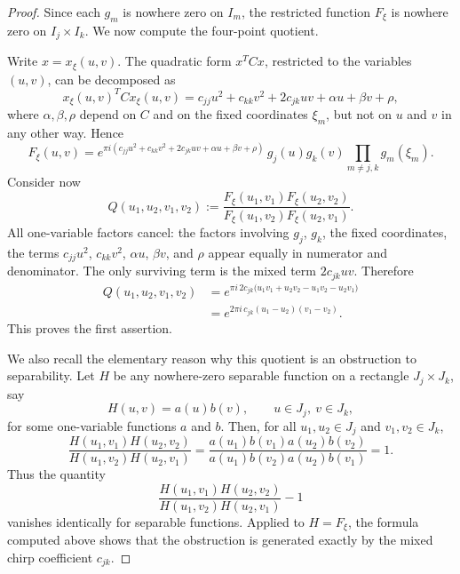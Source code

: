 \documentclass[final,1p,times,authoryear]{elsarticle}
\theoremstyle{definition}
\newcommand{\1}{\mathbf{1}}
\begin{document}
\begin{proof}
{Since each $g_m$ is nowhere zero on $I_m$, the restricted function
$F_\xi$ is nowhere zero on $I_j\times I_k$. We now compute the four-point quotient.}

{Write $x=x_\xi(u,v)$. The quadratic form $x^TCx$, restricted to the variables
$(u,v)$, can be decomposed as
$$
x_\xi(u,v)^T C x_\xi(u,v)
=
c_{jj}u^2+c_{kk}v^2+2c_{jk}uv+\alpha u+\beta v+\rho,
$$
where $\alpha,\beta,\rho$ depend on $C$ and on the fixed coordinates
$\xi_m$, but not on $u$ and $v$ in any other way. Hence
$$
F_\xi(u,v)
=
e^{\pi i(c_{jj}u^2+c_{kk}v^2+2c_{jk}uv+\alpha u+\beta v+\rho)}
\,g_j(u)g_k(v)
\prod_{m\neq j,k}g_m(\xi_m).
$$
Consider now
$$
Q(u_1,u_2,v_1,v_2)
:=
\frac{
F_\xi(u_1,v_1)F_\xi(u_2,v_2)
}{
F_\xi(u_1,v_2)F_\xi(u_2,v_1)
}.
$$
All one-variable factors cancel:
the factors involving $g_j$, $g_k$, the fixed coordinates, the terms
$c_{jj}u^2$, $c_{kk}v^2$, $\alpha u$, $\beta v$, and $\rho$
appear equally in numerator and denominator. The only surviving term is the mixed
term $2c_{jk}uv$. Therefore
$$
\begin{aligned}
Q(u_1,u_2,v_1,v_2)
&=
e^{
\pi i\,2c_{jk}
\big(
u_1v_1+u_2v_2-u_1v_2-u_2v_1
\big)
}\\
&=
e^{
2\pi i\,c_{jk}(u_1-u_2)(v_1-v_2)
}.
\end{aligned}
$$
This proves the first assertion.}

{We also recall the elementary reason why this quotient is an obstruction to
separability. Let $H$ be any nowhere-zero separable function on a rectangle
$J_j\times J_k$, say
$$
H(u,v)=a(u)b(v),
\qquad u\in J_j,\ v\in J_k,
$$
for some one-variable functions $a$ and $b$. Then, for all
$u_1,u_2\in J_j$ and $v_1,v_2\in J_k$,
$$
\frac{
H(u_1,v_1)H(u_2,v_2)
}{
H(u_1,v_2)H(u_2,v_1)
}
=
\frac{
a(u_1)b(v_1)a(u_2)b(v_2)
}{
a(u_1)b(v_2)a(u_2)b(v_1)
}
=
1.
$$
Thus the quantity
$$
\frac{
H(u_1,v_1)H(u_2,v_2)
}{
H(u_1,v_2)H(u_2,v_1)
}
-1
$$
vanishes identically for separable functions. Applied to $H=F_\xi$, the formula
computed above shows that the obstruction is generated exactly by the mixed chirp
coefficient $c_{jk}$.}


\end{proof}
\end{document}
